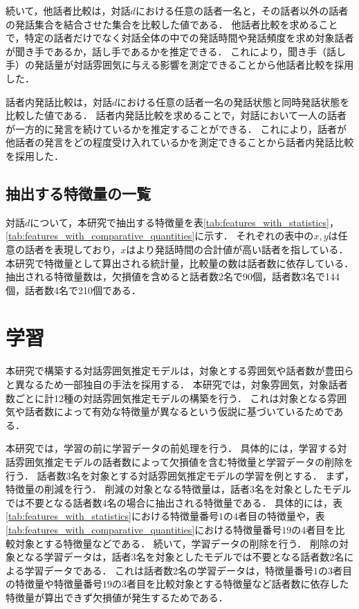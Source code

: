 続いて，他話者比較は，対話$d$における任意の話者一名と，その話者以外の話者の発話集合を結合させた集合を比較した値である．
他話者比較を求めることで，特定の話者だけでなく対話全体の中での発話時間や発話頻度を求め対象話者が聞き手であるか，話し手であるかを推定できる．
これにより，聞き手（話し手）の発話量が対話雰囲気に与える影響を測定できることから他話者比較を採用した．

話者内発話比較は，対話$d$における任意の話者一名の発話状態と同時発話状態を比較した値である．
話者内発話比較を求めることで，対話において一人の話者が一方的に発言を続けているかを推定することができる．
これにより，話者が他話者の発言をどの程度受け入れているかを測定できることから話者内発話比較を採用した．

\subsection{抽出する特徴量の一覧}

対話$d$について，本研究で抽出する特徴量を表\ref{tab:features_with_statistics}，\ref{tab:features_with_comparative_quantities}に示す．
それぞれの表中の$x, y$は任意の話者を表現しており，$x$はより発話時間の合計値が高い話者を指している．
本研究で特徴量として算出される統計量，比較量の数は話者数に依存している．
抽出される特徴量数は，欠損値を含めると話者数2名で90個，話者数3名で144個，話者数4名で210個である．




\section{学習\label{node:machine_learning}}

本研究で構築する対話雰囲気推定モデルは，対象とする雰囲気や話者数が豊田らと異なるため一部独自の手法を採用する．
本研究では，対象雰囲気，対象話者数ごとに計12種の対話雰囲気推定モデルの構築を行う．
これは対象となる雰囲気や話者数によって有効な特徴量が異なるという仮説に基づいているためである．

本研究では，学習の前に学習データの前処理を行う．
具体的には，学習する対話雰囲気推定モデルの話者数によって欠損値を含む特徴量と学習データの削除を行う．
話者数3名を対象とする対話雰囲気推定モデルの学習を例とする．
まず，特徴量の削減を行う．
削減の対象となる特徴量は，話者3名を対象としたモデルでは不要となる話者数4名の場合に抽出される特徴量である．
具体的には，表\ref{tab:features_with_statistics}における特徴量番号$1$の4者目の特徴量や，表\ref{tab:features_with_comparative_quantities}における特徴量番号$19$の4者目を比較対象とする特徴量などである．
続いて，学習データの削除を行う．
削除の対象となる学習データは，話者3名を対象としたモデルでは不要となる話者数2名による学習データである．
これは話者数2名の学習データは，特徴量番号$1$の3者目の特徴量や特徴量番号$19$の3者目を比較対象とする特徴量など話者数に依存した特徴量が算出できず欠損値が発生するためである．


